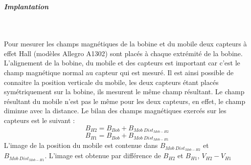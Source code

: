 \documentclass[11pt, french]{article} %
\begin{document}
\subparagraph*{Implantation}~\\
\begin{minipage}[t]{10cm}
Pour mesurer les champs magnétiques de la bobine et du mobile deux capteurs à effet Hall (modèles Allegro A1302) sont placés à chaque extrémité de la bobine. L'alignement de la bobine, du mobile et des capteurs est important car c'est le champ magnétique normal au capteur qui est mesuré. Il est ainsi possible de connaitre la position verticale du mobile, les deux capteurs étant placés symétriquement sur la bobine, ils mesurent le même champ résultant. Le champ résultant du mobile n'est pas le même pour les deux capteurs, en effet, le champ diminue avec la distance. Le bilan des champs magnétiques exercés sur les capteurs est le suivant :
\vspace{-0.3cm} \[B_{H2} = B_{Bob} + B_{Mob~Dist_{Mob-H2}}\]
\vspace{-0.8cm} \[B_{H1} = B_{Bob} + B_{Mob~Dist_{Mob-H1}}\]
L'image de la position du mobile est contenue dans  $B_{Mob~Dist_{Mob-H2}}$ et $B_{Mob~Dist_{Mob-H1}}$. L'image est obtenue par différence de $B_{H2}$ et $B_{H1}$, $V_{H2}-V_{H1}$
\end{minipage}
~
\begin{minipage}[t]{8cm}
\vspace{-7cm}
\end{minipage}
\end{document}
